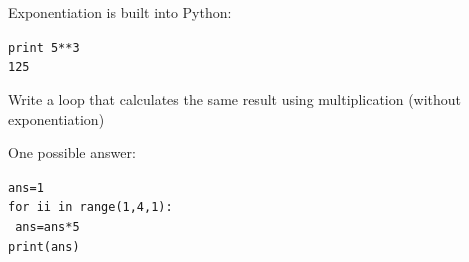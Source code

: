 \documentclass{beamer}
\begin{document}

\begin{frame}{ }

Exponentiation is built into Python:

\vspace{0.5cm}

\begin{beamerboxesrounded}[upper=uppercolgreen,lower=lowercolgreen,shadow=false]{}

\texttt{print 5**3\\
125}
\end{beamerboxesrounded}

\vspace{0.5cm}

Write a loop that calculates the same result using multiplication (without exponentiation)

\alert{One possible answer:}

\texttt{ans=1}\\
\texttt{for ii in range(1,4,1):}\\
\texttt{      ans=ans*5}\\
\texttt{print(ans)}

\end{frame}

\end{document}

